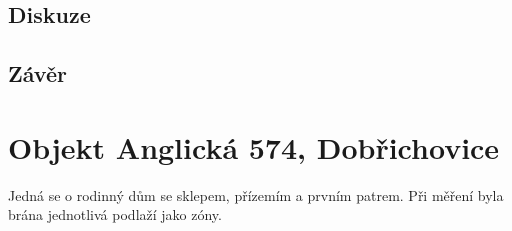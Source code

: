 \subsection{Diskuze}

\subsection{Závěr}

\section{Objekt Anglická 574, Dobřichovice}
Jedná se o rodinný dům se sklepem, přízemím a prvním patrem. Při měření byla brána jednotlivá podlaží jako zóny. 




